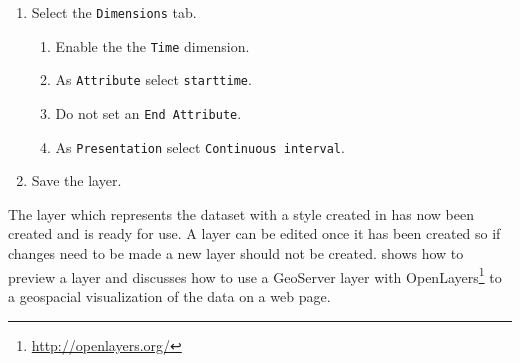 \begin{enumerate}[resume]
	\item Select the \lstinline|Dimensions| tab.
	\begin{enumerate}
		\item Enable the the \lstinline|Time| dimension.
		\item As \lstinline|Attribute| select \lstinline|starttime|.
		\item Do not set an \lstinline|End Attribute|.
		\item As \lstinline|Presentation| select \lstinline|Continuous interval|.
	\end{enumerate}
	\item Save the layer.
\end{enumerate}

The layer which represents the dataset with a style created in  has now been created and is ready for use. A layer can be edited once it has been created so if changes need to be made a new layer should not be created.  shows how to preview a layer and  discusses how to use a GeoServer layer with OpenLayers\footnote{\url{http://openlayers.org/}} to a geospacial visualization of the data on a web page.